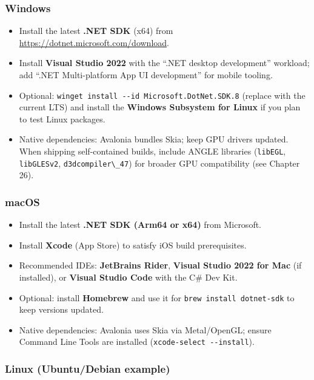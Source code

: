 \subsubsection{Windows}\label{windows}

\begin{itemize}
\tightlist
\item
  Install the latest \textbf{.NET SDK} (x64) from
  \url{https://dotnet.microsoft.com/download}.
\item
  Install \textbf{Visual Studio 2022} with the ``.NET desktop
  development'' workload; add ``.NET Multi-platform App UI development''
  for mobile tooling.
\item
  Optional:
  \passthrough{\lstinline!winget install --id Microsoft.DotNet.SDK.8!}
  (replace with the current LTS) and install the \textbf{Windows
  Subsystem for Linux} if you plan to test Linux packages.
\item
  Native dependencies: Avalonia bundles Skia; keep GPU drivers updated.
  When shipping self-contained builds, include ANGLE libraries
  (\passthrough{\lstinline!libEGL!},
  \passthrough{\lstinline!libGLESv2!},
  \passthrough{\lstinline!d3dcompiler\_47!}) for broader GPU
  compatibility (see Chapter 26).
\end{itemize}

\subsubsection{macOS}\label{macos}

\begin{itemize}
\tightlist
\item
  Install the latest \textbf{.NET SDK (Arm64 or x64)} from Microsoft.
\item
  Install \textbf{Xcode} (App Store) to satisfy iOS build prerequisites.
\item
  Recommended IDEs: \textbf{JetBrains Rider}, \textbf{Visual Studio 2022
  for Mac} (if installed), or \textbf{Visual Studio Code} with the C\#
  Dev Kit.
\item
  Optional: install \textbf{Homebrew} and use it for
  \passthrough{\lstinline!brew install dotnet-sdk!} to keep versions
  updated.
\item
  Native dependencies: Avalonia uses Skia via Metal/OpenGL; ensure
  Command Line Tools are installed
  (\passthrough{\lstinline!xcode-select --install!}).
\end{itemize}

\subsubsection{Linux (Ubuntu/Debian
example)}\label{linux-ubuntudebian-example}

